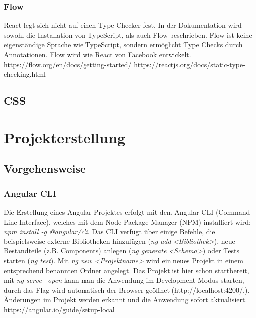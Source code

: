 \subsubsection{Flow}

React legt sich nicht auf einen Type Checker fest. In der Dokumentation wird sowohl die Installation von TypeScript, als auch Flow beschrieben. Flow ist keine eigenständige Sprache wie TypeScript, sondern ermöglicht Type Checks durch Annotationen. Flow wird wie React von Facebook entwickelt.
https://flow.org/en/docs/getting-started/
https://reactjs.org/docs/static-type-checking.html
  
\subsection{CSS}

\section{Projekterstellung}
\subsection{Vorgehensweise}
\subsubsection{Angular CLI}
Die Erstellung eines Angular Projektes erfolgt mit dem Angular CLI (Command Line Interface), welches mit dem Node Package Manager (NPM) installiert wird: \textit{npm install -g @angular/cli}. Das CLI verfügt über einige Befehle, die beispielsweise externe Bibliotheken hinzufügen (\textit{ng add <Bibliothek>}), neue Bestandteile (z.B. Components) anlegen (\textit{ng generate <Schema>}) oder Tests starten (\textit{ng test}). Mit \textit{ng new <Projektname>} wird ein neues Projekt in einem entsprechend benannten Ordner angelegt. Das Projekt ist hier schon startbereit, mit \textit{ng serve --open} kann man die Anwendung im Development Modus starten, durch das Flag wird automatisch der Browser geöffnet (http://localhost:4200/.). Änderungen im Projekt werden erkannt und die Anwendung sofort aktualisiert.
https://angular.io/guide/setup-local

